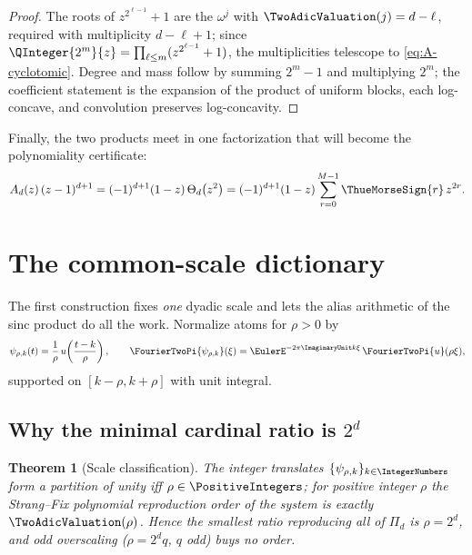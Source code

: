 \documentclass[11pt,oneside]{article}
\numberwithin{equation}{section}
\newtheorem{theorem}{Theorem}[section]
\theoremstyle{definition}
\theoremstyle{remark}
\newcommand{\ThetaTM}{\Theta}
\newcommand{\PiD}{\Pi_d}
\begin{document}
\begin{proof}
The roots of $z^{2^{\ell-1}}+1$ are the $\omega^{j}$ with
$\TwoAdicValuation(j)=d-\ell$, required with multiplicity $d-\ell+1$; since
$\QInteger{2^{m}}{z}=\prod_{\ell\le m}(z^{2^{\ell-1}}+1)$, the multiplicities
telescope to \eqref{eq:A-cyclotomic}.  Degree and mass follow by
summing $2^{m}-1$ and multiplying $2^{m}$; the coefficient statement
is the expansion of the product of uniform blocks, each log-concave,
and convolution preserves log-concavity.
\end{proof}

Finally, the two products meet in one factorization that will become
the polynomiality certificate:
\begin{equation}
 A_d(z)\,(z-1)^{d+1}
 =(-1)^{d+1}(1-z)\,\ThetaTM_d\bigl(z^{2}\bigr)
 =(-1)^{d+1}(1-z)\sum_{r=0}^{M-1}\ThueMorseSign{r}\,z^{2r}.
 \label{eq:TM-factor}
\end{equation}

\section{The common-scale dictionary}
\label{sec:dictionary}

The first construction fixes \emph{one} dyadic scale and lets the
alias arithmetic of the sinc product do all the work.  Normalize atoms
for $\rho>0$ by
\begin{equation}
 \psi_{\rho,k}(t)=\frac1\rho\,u\!\left(\frac{t-k}{\rho}\right),
 \qquad
 \FourierTwoPi{\psi_{\rho,k}}(\xi)=\EulerE^{-2\pi\ImaginaryUnit k\xi}\,\FourierTwoPi{u}(\rho\xi),
 \label{eq:psi-def}
\end{equation}
supported on $[k-\rho,k+\rho]$ with unit integral.

\subsection{Why the minimal cardinal ratio is
\texorpdfstring{$2^{d}$}{2 to the d}}

\begin{theorem}[Scale classification]
\label{thm:scale-classification}
The integer translates $\{\psi_{\rho,k}\}_{k\in\IntegerNumbers}$ form a partition
of unity iff $\rho\in\PositiveIntegers$; for positive integer $\rho$ the Strang--Fix
polynomial reproduction order of the system is exactly
$\TwoAdicValuation(\rho)$.  Hence the smallest ratio reproducing all of $\PiD$ is
$\rho=2^{d}$, and odd overscaling ($\rho=2^{d}q$, $q$ odd) buys no
order.
\end{theorem}
\end{document}
